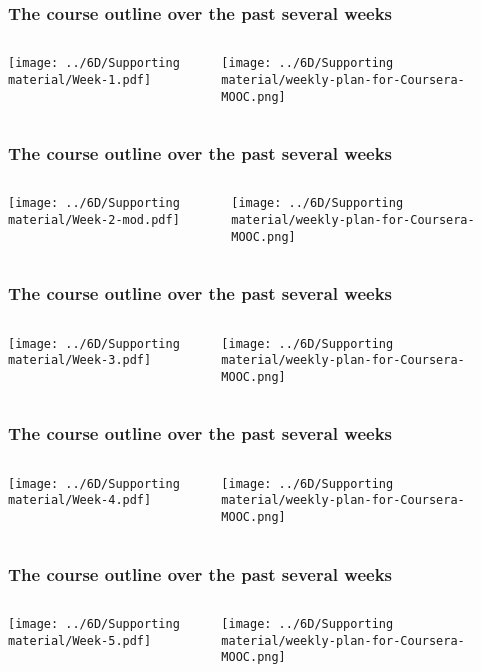 \begin{frame}\frametitle{The course outline over the past several weeks}
	\begin{columns}[T]
			\centerline{\texttt{[image: ../6D/Supporting material/Week-1.pdf]}}
			\centerline{\texttt{[image: ../6D/Supporting material/weekly-plan-for-Coursera-MOOC.png]}}
	\end{columns}
\end{frame}

\begin{frame}\frametitle{The course outline over the past several weeks}
	\begin{columns}[T]
			\centerline{\texttt{[image: ../6D/Supporting material/Week-2-mod.pdf]}}
			\centerline{\texttt{[image: ../6D/Supporting material/weekly-plan-for-Coursera-MOOC.png]}}
	\end{columns}
\end{frame}

\begin{frame}\frametitle{The course outline over the past several weeks}
	\begin{columns}[T]
			\centerline{\texttt{[image: ../6D/Supporting material/Week-3.pdf]}}
			\centerline{\texttt{[image: ../6D/Supporting material/weekly-plan-for-Coursera-MOOC.png]}}
	\end{columns}
\end{frame}

\begin{frame}\frametitle{The course outline over the past several weeks}
	\begin{columns}[T]
			\centerline{\texttt{[image: ../6D/Supporting material/Week-4.pdf]}}
			\centerline{\texttt{[image: ../6D/Supporting material/weekly-plan-for-Coursera-MOOC.png]}}
	\end{columns}
\end{frame}

\begin{frame}\frametitle{The course outline over the past several weeks}
	\begin{columns}[T]
			\centerline{\texttt{[image: ../6D/Supporting material/Week-5.pdf]}}
			\centerline{\texttt{[image: ../6D/Supporting material/weekly-plan-for-Coursera-MOOC.png]}}
	\end{columns}
\end{frame}

